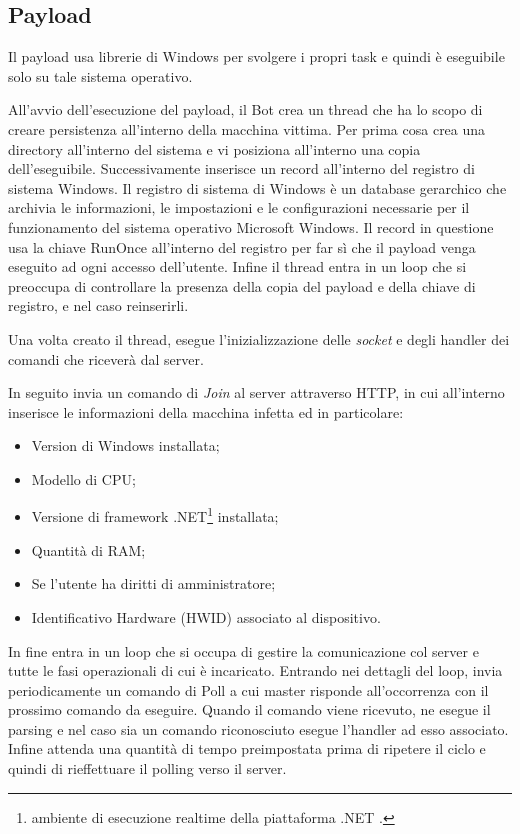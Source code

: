 \subsection{Payload}
Il payload usa librerie di Windows per svolgere i propri task e quindi è eseguibile solo su tale sistema operativo.

All'avvio dell'esecuzione del payload, il Bot crea un thread che ha lo scopo di creare persistenza all'interno della macchina vittima.  Per prima cosa crea una directory all'interno del sistema e vi posiziona all'interno una copia dell'eseguibile. Successivamente inserisce un record all'interno del registro di sistema Windows.
Il registro di sistema di Windows è un database gerarchico che archivia le informazioni, le impostazioni e le configurazioni necessarie per il funzionamento  del sistema operativo Microsoft Windows.
Il record in questione usa la chiave RunOnce all'interno del registro per far sì che il payload venga eseguito ad ogni accesso dell'utente. Infine il thread entra in un loop che si preoccupa di controllare la presenza della copia del payload e della chiave di registro, e nel caso reinserirli.

Una  volta creato il thread, esegue l'inizializzazione delle \textit{socket} e degli handler dei comandi che riceverà dal server.

In seguito invia un comando di \textit{Join} al server attraverso HTTP, in cui all'interno inserisce le informazioni della macchina infetta ed in particolare:
\begin{itemize}
    \item Version di Windows installata;
    \item Modello di CPU;
    \item Versione di framework .NET\footnote{ambiente di esecuzione realtime della piattaforma .NET \cite{netframework}.} installata;
    \item Quantità di RAM;
    \item Se l'utente ha diritti di amministratore;
    \item Identificativo Hardware (HWID) associato al dispositivo.
\end{itemize}
In fine entra in un loop che si occupa di gestire la comunicazione col server e tutte le fasi operazionali di cui è incaricato.
Entrando nei dettagli del loop, invia periodicamente un comando di Poll  a cui master risponde all'occorrenza con il prossimo comando da eseguire. Quando il comando viene ricevuto, ne esegue il parsing e nel caso sia un comando riconosciuto esegue l'handler ad esso associato. Infine attenda una quantità di tempo preimpostata prima di ripetere il ciclo e quindi di rieffettuare il polling verso il server.

